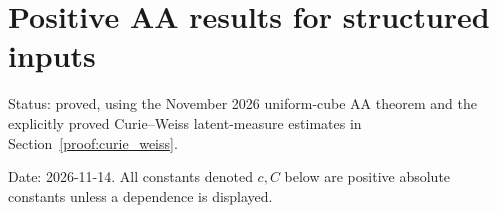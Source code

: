 \begingroup
\setlength{\parskip}{3pt plus 0.5pt}
\renewcommand{\tightlist}{\setlength{\itemsep}{1pt}\setlength{\parskip}{0pt}}
\section{Positive AA results for structured inputs}\label{ht:positive-aa-results-for-structured-inputs}\label{proof:high_temperature}

Status: proved, using the November 2026 uniform-cube AA theorem and the explicitly proved Curie--Weiss latent-measure estimates in Section~\ref{proof:curie_weiss}.

Date: 2026-11-14. All constants denoted \(c,C\) below are positive absolute constants unless a dependence is displayed.








